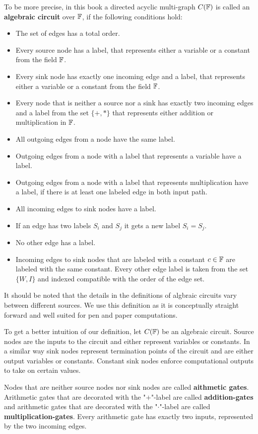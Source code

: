 To be more precise, in this book a directed acyclic multi-graph $C(\mathbb{F})$ is called an \textbf{algebraic circuit} over $\mathbb{F}$, if the following conditions hold:
\begin{itemize}
\item The set of edges has a total order.  
\item Every source node has a label, that represents either a variable or a constant from the field $\mathbb{F}$.
\item Every sink node has exactly one incoming edge and a label, that represents either a variable or a constant from the field $\mathbb{F}$.
\item Every node that is neither a source nor a sink has exactly two incoming edges and a label from the set $\{+,*\}$ that represents either addition or multiplication in $\mathbb{F}$.
\item All outgoing edges from a node have the same label.
\item Outgoing edges from a node with a label that represents a variable have a label.
\item Outgoing edges from a node with a label that represents multiplication have a label, if there is at least one labeled edge in both input path.
\item All incoming edges to sink nodes have a label.
\item If an edge has two labels $S_i$ and $S_j$ it gets a new label $S_i = S_j$.
\item No other edge has a label.
\item Incoming edges to sink nodes that are labeled with a constant $c\in\mathbb{F}$ are labeled with the same constant. Every other edge label is taken from the set $\{W,I\}$ and indexed compatible with the order of the edge set. 
\end{itemize} 
It should be noted that the details in the definitions of algbraic circuits vary between different sources. We use this definition as it is conceptually straight forward and well suited for pen and paper computations.

To get a better intuition of our definition, let $C(\mathbb{F})$ be an algebraic circuit. Source nodes are the inputs to the circuit and either represent variables or constants. In a similar way sink nodes represent termination points of the circuit and are either output variables or constants. Constant sink nodes enforce computational outputs to take on certain values.  

Nodes that are neither source nodes nor sink nodes are called \textbf{aithmetic gates}. Arithmetic gates that are decorated with the "$+$"-label are called \textbf{addition-gates} and arithmetic gates that are decorated with the "$\cdot$"-label are called \textbf{multiplication-gates}. Every arithmetic gate has exactly two inputs, represented by the two incoming edges.

